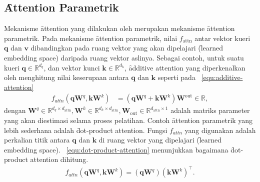 	\subsection{\f{Attention} Parametrik}
	Mekanisme \f{attention} yang dilakukan oleh \cite{transformerori} merupakan mekanisme \f{attention} parametrik. Pada mekanisme \f{attention} parametrik, nilai $f_{\text{attn}}$ antar vektor kueri $\mathbf{q}$ dan $\mathbf{v}$ dibandingkan pada ruang vektor yang akan dipelajari (\f{learned embedding space}) daripada ruang vektor aslinya. Sebagai contoh, untuk suatu kueri $\mathbf{q}\in \mathbb{R}^{d_q}$, dan vektor kunci $\mathbf{k} \in \mathbb{R}^{d_k}$, \f{additive attention} yang diperkenalkan oleh \cite{bahdanau2016neural} menghitung nilai keserupaan antara $\mathbf{q}$ dan $\mathbf{k}$ seperti pada \equ~\ref{equ:additive-attention}
	\begin{align}
	\label{equ:additive-attention}
	f_{attn}(\mathbf{q} \mathbf{W}^q, \mathbf{k} \mathbf{W}^k) &= (\mathbf{q} \mathbf{W}^q  + \mathbf{k} \mathbf{W}^k)  \mathbf{W}^{\text{out}} \in \mathbb{R},
	\end{align}
	dengan $\mathbf{W}^q \in \mathbb{R}^{d_q \times d_{\text{attn}}}, \mathbf{W}^k \in \mathbb{R}^{d_k \times d_{\text{attn}}}, \mathbf{W}_{\text{out}} \in \mathbb{R}^{d_{\text{attn}} \times 1}$ adalah matriks parameter yang akan diestimasi selama proses pelatihan. Contoh \f{attention} parametrik yang lebih sederhana adalah \f{dot-product attention}. Fungsi $f_{attn}$ yang digunakan adalah perkalian titik antara $\mathbf{q}$ dan $\mathbf{k}$ di ruang vektor yang dipelajari (\f{learned embedding space}). \equ~\ref{equ:dot-product-attention} menunjukkan bagaimana \f{dot-product attention} dihitung.
	\begin{align}
		\label{equ:dot-product-attention}
		f_{attn}(\mathbf{q} \mathbf{W}^q, \mathbf{k} \mathbf{W}^k) = (\mathbf{q} \mathbf{W}^q) (\mathbf{k} \mathbf{W}^k)^{\top}.
	\end{align}

